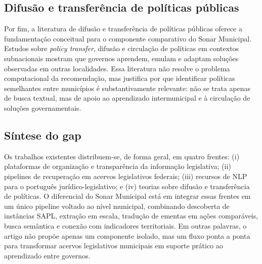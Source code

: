 \subsection{Difusão e transferência de políticas públicas}

Por fim, a literatura de difusão e transferência de políticas públicas oferece a fundamentação conceitual para o componente comparativo do Sonar Municipal. Estudos sobre \textit{policy transfer}, difusão e circulação de políticas em contextos subnacionais mostram que governos aprendem, emulam e adaptam soluções observadas em outras localidades. Essa literatura não resolve o problema computacional da recomendação, mas justifica por que identificar políticas semelhantes entre municípios é substantivamente relevante: não se trata apenas de busca textual, mas de apoio ao aprendizado intermunicipal e à circulação de soluções governamentais.

\subsection{Síntese do gap}

Os trabalhos existentes distribuem-se, de forma geral, em quatro frentes: (i) plataformas de organização e transparência da informação legislativa; (ii) pipelines de recuperação em acervos legislativos federais; (iii) recursos de NLP para o português jurídico-legislativo; e (iv) teorias sobre difusão e transferência de políticas. O diferencial do Sonar Municipal está em integrar essas frentes em um único pipeline voltado ao nível municipal, combinando descoberta de instâncias SAPL, extração em escala, tradução de ementas em ações comparáveis, busca semântica e conexão com indicadores territoriais. Em outras palavras, o artigo não propõe apenas um componente isolado, mas um fluxo ponta a ponta para transformar acervos legislativos municipais em suporte prático ao aprendizado entre governos.
